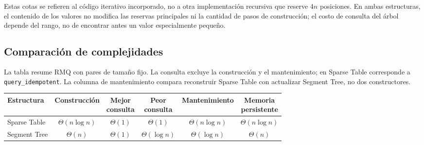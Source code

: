 Estas cotas se refieren al código iterativo incorporado, no a otra
implementación recursiva que reserve \(4n\) posiciones. En ambas estructuras,
el contenido de los valores no modifica las reservas principales ni la cantidad
de pasos de construcción; el costo de consulta del árbol depende del rango,
no de encontrar antes un valor especialmente pequeño.

\subsection{Comparación de complejidades}

La tabla resume RMQ con pares de tamaño fijo. La consulta excluye la
construcción y el mantenimiento; en Sparse Table corresponde a
\texttt{query\_idempotent}. La columna de mantenimiento compara reconstruir
Sparse Table con actualizar Segment Tree, no dos constructores.

\begingroup
\centering
\small
\begin{tabular}{@{}lccccc@{}}
\toprule
\textbf{Estructura} & \textbf{Construcción} &
\shortstack{\textbf{Mejor}\\\textbf{consulta}} &
\shortstack{\textbf{Peor}\\\textbf{consulta}} &
\textbf{Mantenimiento} & \shortstack{\textbf{Memoria}\\\textbf{persistente}} \\
\midrule
Sparse Table & \(\Theta(n\log n)\) & \(\Theta(1)\) & \(\Theta(1)\) &
\(\Theta(n\log n)\) & \(\Theta(n\log n)\) \\
Segment Tree & \(\Theta(n)\) & \(\Theta(1)\) & \(\Theta(\log n)\) &
\(\Theta(\log n)\) & \(\Theta(n)\) \\
\bottomrule
\end{tabular}
\par
\endgroup
